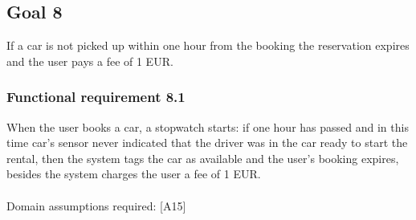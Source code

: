 \subsection{Goal 8}
If a car is not picked up within one hour from the booking the reservation expires and the user pays a fee of 1 EUR.

\setcounter{secnumdepth}{3}
\subsubsection{Functional requirement 8.1}
When the user books a car, a stopwatch starts: if one hour has passed and in this time car's sensor never indicated that the driver was in the car ready to start the rental, then the system tags the car as available and the user’s booking expires, besides the system charges the user a fee of 1 EUR.\\~\\
\noindent Domain assumptions required: [A15]